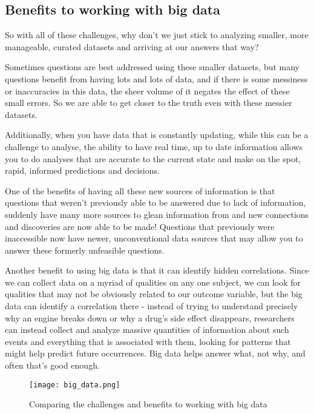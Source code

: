 \documentclass[11pt,fancy]{elegantbook}
\begin{document}
\subsection{Benefits to working with big data}
So with all of these challenges, why don't we just stick to analyzing smaller, more manageable, curated datasets and arriving at our answers that way?
\par Sometimes questions are best addressed using these smaller datasets, but many questions benefit from having lots and lots of data, and if there is some messiness or inaccuracies in this data, the sheer volume of it negates the effect of these small errors. So we are able to get closer to the truth even with these messier datasets.
\par Additionally, when you have data that is constantly updating, while this can be a challenge to analyse, the ability to have real time, up to date information allows you to do analyses that are accurate to the current state and make on the spot, rapid, informed predictions and decisions.
\par One of the benefits of having all these new sources of information is that questions that weren't previously able to be answered due to lack of information, suddenly have many more sources to glean information from and new connections and discoveries are now able to be made! Questions that previously were inaccessible now have newer, unconventional data sources that may allow you to answer these formerly unfeasible questions.
\par Another benefit to using big data is that it can identify hidden correlations. Since we can collect data on a myriad of qualities on any one subject, we can look for qualities that may not be obviously related to our outcome variable, but the big data can identify a correlation there - instead of trying to understand precisely why an engine breaks down or why a drug's side effect disappears, researchers can instead collect and analyze massive quantities of information about such events and everything that is associated with them, looking for patterns that might help predict future occurrences. Big data helps answer what, not why, and often that's good enough.
\begin{figure}[H]
    \centering
    \texttt{[image: big\_data.png]}
    \caption{Comparing the challenges and benefits to working with big data}
    \label{fig:big_data_pros_cons}
\end{figure}
\end{document}
